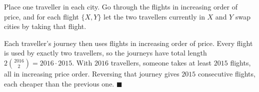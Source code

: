 Place one traveller in each city. Go through the flights in increasing order of price, and for each flight $\{X,Y\}$ let the two travellers currently in $X$ and $Y$ swap cities by taking that flight.

Each traveller's journey then uses flights in increasing order of price. Every flight is used by exactly two travellers, so the journeys have total length $2\binom{2016}{2}=2016\cdot2015$. With $2016$ travellers, someone takes at least $2015$ flights, all in increasing price order. Reversing that journey gives $2015$ consecutive flights, each cheaper than the previous one. $\blacksquare$
